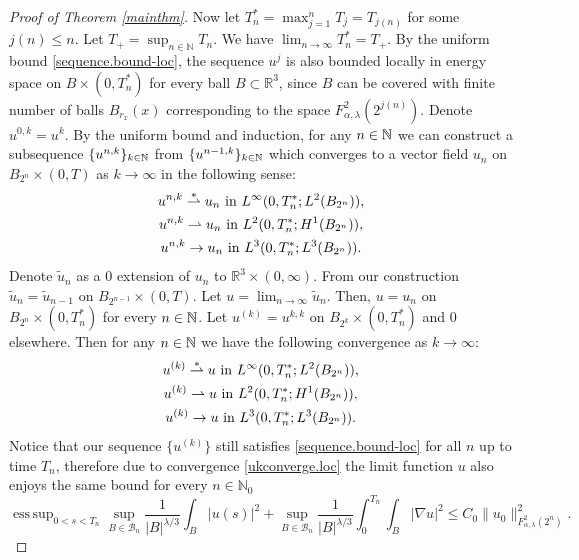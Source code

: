 \documentclass[11pt]{article}
\numberwithin{equation}{section}
\theoremstyle{remark}
\theoremstyle{definition}
\newcommand{\cB}{\mathcal{B}}
\newcommand{\R}{\mathbb{R}}
\newcommand\al{\alpha}
\newcommand\la{\lambda}
\newcommand{\NN}{\mathbb{N}}
\newcommand{\esssup} {\mathop{\mathrm{ess\,sup}}}
\newcommand{\EQ}[1]{\begin{equation} #1 \end{equation}}
\begin{document}
\begin{proof}[Proof of Theorem \ref{mainthm}]
Now let $T_n^* = \max_{j=1}^n T_j = T_{j(n)}$ for some $j(n) \le n$. Let $T_+=\sup_{n \in \NN} T_n$. We have $\lim_{n \to \infty} T_n^* =T_+$.
By the uniform bound \eqref{sequence.bound-loc}, the sequence $u^j$ is also bounded locally in energy space on $B \times (0,T_n^*)$ for every ball $B\subset \R^3$, since $B$ can be covered with finite number of balls $B_{r_x}(x)$ corresponding to the space $F^2_{\al,\la}(2^{j(n)})$. Denote $u^{0,k} = u^k$. By the uniform bound and induction, for any $n\in\Bbb N$
%
we can construct a subsequence $\{u^{n,k}\}_{k\in\Bbb N}$ from $\{u^{n-1,k}\}_{k\in\Bbb N}$ which converges to a vector field $u_n$ on $B_{2^{n}}\times(0,T)$ as $k\rightarrow\infty$ in the following sense:
\EQ{\gathered
u^{n,k}\overset{*}{\rightharpoonup} u_n~\textrm{in} ~L^{\infty}(0,T_n^*;L^2(B_{2^{n}})),
\\
u^{n,k}\rightharpoonup u_n~\textrm{in} ~L^2(0,T_n^*;H^1(B_{2^{n}})),
\\
u^{n,k}\rightarrow u_n~\textrm{in} ~L^{3}(0,T_n^*;L^3(B_{2^{n}})).
\endgathered}
Denote $\tilde{u}_n$ as a $0$ extension of $u_n$  to $\R^3\times (0,\infty)$. From our construction $\tilde{u}_n=\tilde{u}_{n-1}$ on $B_{2^{n-1}}\times(0,T)$. Let $u=\lim_{n\rightarrow\infty} \tilde{u}_n$. Then, $u=u_n$ on $B_{2^{n}}\times(0,T_n^*)$ for every $n\in\Bbb N$.
Let $u^{(k)}=u^{k,k}$ on $B_{2^{k}}\times(0,T_n^*)$ and $0$ elsewhere. Then for any $n\in\Bbb N$ we have the following convergence as $k\rightarrow\infty$:
\EQ{\label{ukconverge.loc}
\gathered
u^{(k)}\overset{*}{\rightharpoonup} u~\textrm{in} ~L^{\infty}(0,T_n^*;L^2(B_{2^{n}})),
\\
u^{(k)}\rightharpoonup u~\textrm{in} ~L^2(0,T_n^*;H^1(B_{2^{n}})),
\\
u^{(k)}\rightarrow u~\textrm{in} ~L^{3}(0,T_n^*;L^3(B_{2^{n}})).
\endgathered}
Notice that our sequence $\{u^{(k)}\}$ still satisfies \eqref{sequence.bound-loc} for all $n$ up to time $T_n$, therefore due to convergence \eqref{ukconverge.loc} the limit function $u$ also enjoys the same bound for every $n \in \NN_0$
 \EQ{\label{apriori}
\esssup_{0<s<T_n}\sup_{B\in \cB_n} \frac 1 {|B|^{\la/3}}\int_B |u(s)|^2 +\sup_{B\in \mathcal{B}_n}\frac{1}{|B|^{\la/3}}\int_0^{T_n}\!\!\!\int_{B}|\nabla u|^2\le C_0\|u_0\|_{F^2_{\al,\la}(2^{n})}^2.
}
\medskip



\end{proof}
\end{document}

